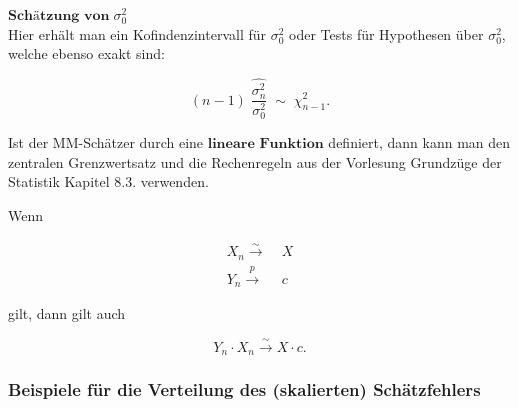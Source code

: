 \documentclass[10pt]{article}
\newcommand{\KW}{\overset{p} \longrightarrow} %
\newcommand{\KV}{\overset{\sim} \longrightarrow} %
\begin{document}
		\noindent $\textbf{Schätzung von} \; \sigma^2_0$\\
	Hier erhält man ein Kofindenzintervall für $\sigma^2_0$ oder Tests für Hypothesen über $\sigma^2_0$, welche ebenso exakt sind:
	
	\begin{equation*}
		(n-1) \; \frac{\hat{\sigma^2_n}}{\sigma^2_0} \; {\sim} \; \chi^2_{n-1}.
	\end{equation*}
	
		\noindent Ist der MM-Schätzer durch eine $\textbf{lineare Funktion}$ definiert, dann kann man den zentralen Grenzwertsatz und die Rechenregeln aus der Vorlesung Grundzüge der Statistik Kapitel 8.3. verwenden. 
	
	\noindent Wenn
	
	\begin{equation*}
		\begin{split}
				X_n \KV& \; X \\
			Y_n \KW& \;c
		\end{split}
	\end{equation*}
	
	\noindent gilt, dann gilt auch
	
	\begin{equation*}
		Y_n \cdot X_n \KV X\cdot c.
	\end{equation*}
	
	
	\subsubsection{Beispiele für die Verteilung des (skalierten) Schätzfehlers}
	
\end{document}
